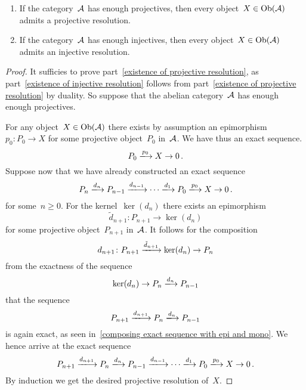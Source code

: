 \begin{lemma}
  \leavevmode
  \begin{enumerate}
    \item
      \label{existence of projective resolution}
      If the category~$\mathcal{A}$ has enough projectives, then every object~$X \in \operatorname{Ob}(\mathcal{A})$ admits a projective resolution.
    \item
      \label{existence of injective resolution}
      If the category~$\mathcal{A}$ has enough injectives, then every object~$X \in \operatorname{Ob}(\mathcal{A})$ admits an injective resolution.
  \end{enumerate}
\end{lemma}


\begin{proof}
  It sufficies to prove part~\ref*{existence of projective resolution}, as part~\ref*{existence of injective resolution} follows from part~\ref*{existence of projective resolution} by duality.
  So suppose that the abelian category~$\mathcal{A}$ has enough enough projectives.
  
  For any object~$X \in \operatorname{Ob}(\mathcal{A})$ there exists by assumption an epimorphism~$p_0 \colon P_0 \to X$ for some projective object~$P_0$ in~$\mathcal{A}$.
  We have thus an exact sequence.
  \[
    P_0
    \xlongto{p_0}
    X
    \to
    0 \,.
  \]
  Suppose now that we have already constructed an exact sequence
  \[
    P_n
    \xlongto{d_n}
    P_{n-1}
    \xlongto{d_{n-1}}
    \dotsb
    \xlongto{d_1}
    P_0
    \xlongto{p_0}
    X
    \to
    0 \,.
  \]
  for some~$n \geq 0$.
  For the kernel~$\ker(d_n)$ there exists an epimorphism
  \[
    \tilde{d}_{n+1}
    \colon
    P_{n+1}
    \to
    \ker(d_n)
  \]
  for some projective object~$P_{n+1}$ in~$\mathcal{A}$.
  It follows for the composition
  \[
    d_{n+1}
    \colon
    P_{n+1}
    \xlongto{\tilde{d}_{n+1}}
    \ker(d_n)
    \to
    P_n
  \]
  from the exactness of the sequence
  \[
    \ker(d_n)
    \to
    P_n
    \xlongto{d_n}
    P_{n-1}
  \]
  that the sequence
  \[
    P_{n+1}
    \xlongto{d_{n+1}}
    P_n
    \xlongto{d_n}
    P_{n-1}
  \]
  is again exact, as seen in~\cref{composing exact sequence with epi and mono}.
  We hence arrive at the exact sequence
  \[
    P_{n+1}
    \xlongto{d_{n+1}}
    P_n
    \xlongto{d_n}
    P_{n-1}
    \xlongto{d_{n-1}}
    \dotsb
    \xlongto{d_1}
    P_0
    \xlongto{p_0}
    X
    \to
    0 \,.
  \]
  By induction we get the desired projective resolution of~$X$.
\end{proof}


